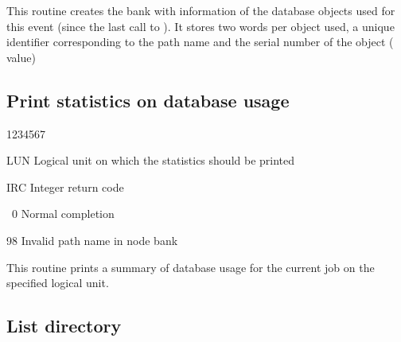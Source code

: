This routine creates the  bank with information of the database objects used
for this event (since the last call to ). It stores two words
per object used, a unique identifier corresponding to the path
name and the serial number of the object ( value)

\subsection{Print statistics on database usage}


\begin{DLtt}{1234567}
\item[LUN]Logical unit on which the statistics should be printed
\item[IRC]Integer return code
  \begin{DLtt}{12}
    \item[\ 0]Normal completion
    \item[98]Invalid path name in node bank
  \end{DLtt}
\end{DLtt}

This routine prints a summary of database usage for the current
job on the specified logical unit.

\subsection{List directory}


